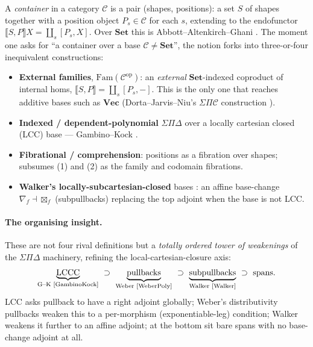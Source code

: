 \documentclass[11pt]{article}
\theoremstyle{plain}
\theoremstyle{definition}
\theoremstyle{remark}
\newcommand{\C}{\mathcal{C}}
\newcommand{\Set}{\mathbf{Set}}
\newcommand{\Vect}{\mathbf{Vec}}
\newcommand{\Fam}{\mathrm{Fam}}
\newcommand{\ext}[1]{\llbracket #1 \rrbracket}
\newcommand{\ihom}[2]{[#1,#2]}
\newcommand{\op}{\mathrm{op}}
\begin{document}
A \emph{container} in a category $\C$ is a pair (shapes, positions): a set $S$ of shapes together with
a position object $P_s\in\C$ for each $s$, extending to the endofunctor
$\ext{S,P}X=\coprod_{s}\ihom{P_s}{X}$. Over $\Set$ this is Abbott--Altenkirch--Ghani \cite{AAG}. The
moment one asks for ``a container over a base $\C\neq\Set$'', the notion forks into
three-or-four inequivalent constructions:
\begin{itemize}
\item[(1)] \textbf{External families}, $\Fam(\C^\op)$: an \emph{external} $\Set$-indexed coproduct of
internal homs, $\ext{S,P}=\coprod_s\ihom{P_s}{-}$. This is the only one that reaches additive bases
such as $\Vect$ (Dorta--Jarvis--Niu's $\Sigma\Pi\C$ construction \cite{DJN}).
\item[(2)] \textbf{Indexed / dependent-polynomial} $\Sigma\Pi\Delta$ over a locally cartesian closed
(LCC) base --- Gambino--Kock \cite{GambinoKock}.
\item[(3)] \textbf{Fibrational / comprehension}: positions as a fibration over shapes; subsumes (1) and
(2) as the family and codomain fibrations.
\item[(4)] \textbf{Walker's locally-subcartesian-closed} bases \cite{Walker}: an affine base-change
$\nabla_f\dashv\boxtimes_f$ (subpullbacks) replacing the top adjoint when the base is not LCC.
\end{itemize}

\paragraph{The organising insight.} These are not four rival definitions but a \emph{totally ordered
tower of weakenings} of the $\Sigma\Pi\Delta$ machinery, refining the local-cartesian-closure axis:
\[
\underbrace{\text{LCCC}}_{\text{G--K \cite{GambinoKock}}}\ \supset\
\underbrace{\text{pullbacks}}_{\text{Weber \cite{WeberPoly}}}\ \supset\
\underbrace{\text{subpullbacks}}_{\text{Walker \cite{Walker}}}\ \supset\
\text{spans}.
\]
LCC asks pullback to have a right adjoint globally; Weber's distributivity pullbacks weaken this to a
per-morphism (exponentiable-leg) condition; Walker weakens it further to an affine adjoint; at the
bottom sit bare spans with no base-change adjoint at all.
\end{document}
